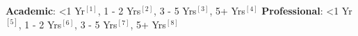 \begin{cventries}

  \cventry
    {} %
    {} 
    {} 
    {} 
    {
      \begin{cvitems} %
        \item[]{\textbf{Academic}: \label{1}{<1 Yr$^{[1]}$}, \label{2}{1 - 2 Yrs$^{[2]}$}, \label{3}{3 - 5 Yrs$^{[3]}$}, \label{4}{5+ Yrs$^{[4]}$}%
		\hspace{2.2cm}
		\textbf{Professional}: \label{5}{<1 Yr$^{[5]}$}, \label{6}{1 - 2 Yrs$^{[6]}$}, \label{7}{3 - 5 Yrs$^{[7]}$}, \label{8}{5+ Yrs$^{[8]}$}}		
      \end{cvitems}
    }  
  \vspace{0.2cm} 
      

\end{cventries}